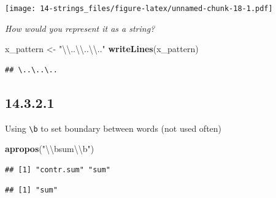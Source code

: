 \documentclass[]{book}
\newenvironment{Shaded}{\begin{snugshade}}{\end{snugshade}}
\newcommand{\CharTok}[1]{\textcolor[rgb]{0.31,0.60,0.02}{#1}}
\newcommand{\KeywordTok}[1]{\textcolor[rgb]{0.13,0.29,0.53}{\textbf{#1}}}
\newcommand{\NormalTok}[1]{#1}
\newcommand{\StringTok}[1]{\textcolor[rgb]{0.31,0.60,0.02}{#1}}
\theoremstyle{definition}
\theoremstyle{definition}
\theoremstyle{definition}
\theoremstyle{remark}
\begin{document}
\begin{enumerate}
  \texttt{[image: 14-strings\_files/figure-latex/unnamed-chunk-18-1.pdf]}

  \emph{How would you represent it as a string?}

\begin{Shaded}
\begin{Highlighting}[]
\NormalTok{x_pattern <-}\StringTok{ "}\CharTok{\textbackslash{}\textbackslash{}}\StringTok{..}\CharTok{\textbackslash{}\textbackslash{}}\StringTok{..}\CharTok{\textbackslash{}\textbackslash{}}\StringTok{.."}
\KeywordTok{writeLines}\NormalTok{(x_pattern)}
\end{Highlighting}
\end{Shaded}

\begin{verbatim}
## \..\..\..
\end{verbatim}
\end{enumerate}

\hypertarget{section-42}{%
\subsection{14.3.2.1}\label{section-42}}

Using \texttt{\textbackslash{}b} to set boundary between words (not used
often)

\begin{Shaded}
\begin{Highlighting}[]
\KeywordTok{apropos}\NormalTok{(}\StringTok{"}\CharTok{\textbackslash{}\textbackslash{}}\StringTok{bsum}\CharTok{\textbackslash{}\textbackslash{}}\StringTok{b"}\NormalTok{)}
\end{Highlighting}
\end{Shaded}

\begin{verbatim}
## [1] "contr.sum" "sum"
\end{verbatim}

\begin{Shaded}
\end{Shaded}

\begin{verbatim}
## [1] "sum"
\end{verbatim}
\end{document}

